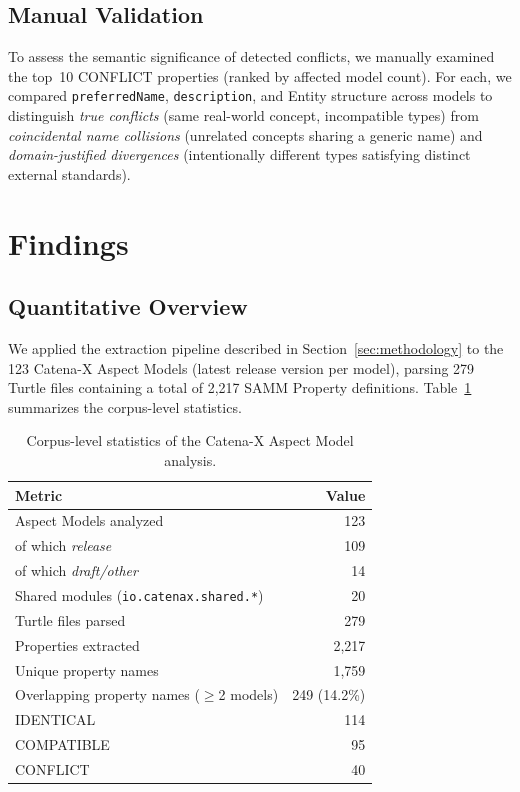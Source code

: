\documentclass[]{ceurart}
\begin{document}
\subsection{Manual Validation}\label{sec:validation}

To assess the semantic significance of detected conflicts, we manually
examined the top~10 CONFLICT properties (ranked by affected model count).
For each, we compared \texttt{preferredName}, \texttt{description}, and
Entity structure across models to distinguish \emph{true conflicts}
(same real-world concept, incompatible types) from \emph{coincidental
name collisions} (unrelated concepts sharing a generic name) and
\emph{domain-justified divergences} (intentionally different types
satisfying distinct external standards).

\section{Findings}\label{sec:findings}

\subsection{Quantitative Overview}\label{sec:findings-quant}

We applied the extraction pipeline described in Section~\ref{sec:methodology}
to the 123 Catena-X Aspect Models (latest release version per model),
parsing 279 Turtle files containing a total of 2{,}217 SAMM Property
definitions. Table~\ref{tab:summary} summarizes the corpus-level statistics.

\begin{table}[h]
  \caption{Corpus-level statistics of the Catena-X Aspect Model analysis.}
  \label{tab:summary}
  \begin{tabular}{lr}
    \toprule
    Metric & Value \\
    \midrule
    Aspect Models analyzed           & 123 \\
    \quad of which \textit{release}  & 109 \\
    \quad of which \textit{draft/other} & 14 \\
    Shared modules (\texttt{io.catenax.shared.*}) & 20 \\
    Turtle files parsed              & 279 \\
    Properties extracted             & 2{,}217 \\
    Unique property names            & 1{,}759 \\
    Overlapping property names ($\geq$2 models) & 249 (14.2\%) \\
    \quad IDENTICAL                  & 114 \\
    \quad COMPATIBLE                 & 95 \\
    \quad CONFLICT                   & 40 \\
    \bottomrule
  \end{tabular}
\end{table}
\end{document}

